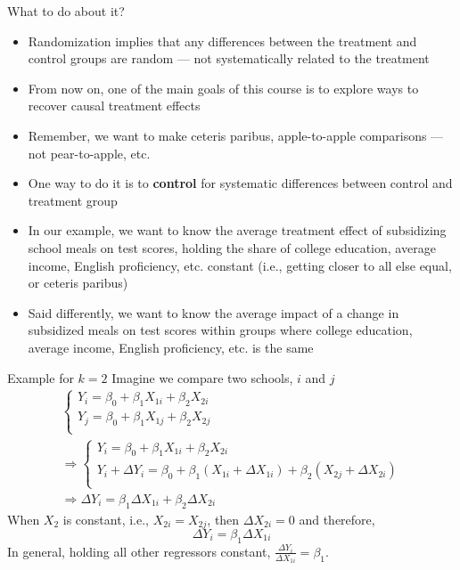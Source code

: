 \documentclass[notes,10pt, aspectratio=169]{beamer}
\begin{document}
\begin{frame}{What to do about it?}
\begin{itemize}
    \item Randomization implies that any differences between the treatment and control groups are random --- not systematically related to the treatment
    \item From now on, one of the main goals of this course is to explore ways to recover causal treatment effects
    \item Remember, we want to make ceteris paribus, apple-to-apple comparisons --- not pear-to-apple, etc.
    \item One way to do it is to \textbf{control} for systematic differences between control and treatment group
    \item In our example, we want to know the average treatment effect of subsidizing school meals on test scores, holding the share of college education, average income, English proficiency, etc. constant (i.e., getting closer to all else equal, or ceteris paribus)
    \item Said differently, we want to know the average impact of a change in subsidized meals on test scores within groups where college education, average income, English proficiency, etc. is the same
\end{itemize}

\end{frame}


\begin{frame}{Example for $k=2$}
Imagine we compare two schools, $i$ and $j$
\begin{eqnarray*}
\begin{cases}
    Y_i = \beta_{0} + \beta_1 X_{1i} + \beta_2 X_{2i}\\
    Y_j = \beta_{0} + \beta_1 X_{1j} + \beta_2 X_{2j}\\
\end{cases}\\
\Rightarrow
\begin{cases}
    Y_i = \beta_{0} + \beta_1 X_{1i} + \beta_2 X_{2i}\\
    Y_i + \Delta Y_i = \beta_{0} + \beta_1 (X_{1i}+ \Delta X_{1i}) + \beta_2 (X_{2j} + \Delta X_{2i})\\
\end{cases}\\
\Rightarrow
\Delta Y_i = \beta_1 \Delta X_{1i} + \beta_2 \Delta X_{2i}
\end{eqnarray*}
When $X_2$ is constant, i.e., $X_{2i}=X_{2j}$, then $\Delta X_{2i}=0$ and therefore,
\begin{equation*}
    \Delta Y_i = \beta_1 \Delta X_{1i}
\end{equation*}
In general, holding all other regressors constant, $\frac{\Delta Y_i}{\Delta X_{1i}}= \beta_1$.
\end{frame}
\end{document}
